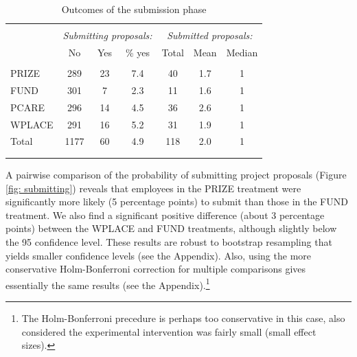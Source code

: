 \documentclass[12pt, titlepage]{article}
\begin{document}
\begin{table}
\centering
\caption{Outcomes of the submission phase}
\label{tab: submissions}
\begin{tabular}{@{}lcccccc}
  \\[-1.8ex]\hline \hline \\[-1.8ex]
 & \multicolumn{3}{c}{\emph{Submitting proposals:}}& \multicolumn{3}{c}{\emph{Submitted proposals:}} \\
 \cmidrule(lr){2-4}\cmidrule(lr){5-7} & No & Yes & \% yes & Total & Mean & Median \\ 
  \hline \\[-1.86ex]
PRIZE & 289 & 23 & 7.4 & 40 & 1.7 & 1 \\ 
  FUND & 301 & 7 & 2.3 & 11 & 1.6 & 1 \\ 
  PCARE & 296 & 14 & 4.5 & 36 & 2.6 & 1 \\ 
  WPLACE & 291 & 16 & 5.2 & 31 & 1.9 & 1 \\ 
  [1.8ex] Total & 1177 & 60 & 4.9 & 118 & 2.0 & 1 \\ 
   \\[-1.8ex]\hline \hline \\[-1.8ex]
\end{tabular}
\end{table}

A pairwise comparison of the probability of submitting project proposals
(Figure \ref{fig: submitting}) reveals that employees in the PRIZE
treatment were significantly more likely (5 percentage points) to submit
than those in the FUND treatment. We also find a significant positive
difference (about 3 percentage points) between the WPLACE and FUND
treatments, although slightly below the 95 confidence level. These
results are robust to bootstrap resampling that yields smaller
confidence levels (see the Appendix). Also, using the more conservative
Holm-Bonferroni correction for multiple comparisons gives essentially
the same results (see the Appendix).\footnote{The Holm-Bonferroni
  precedure is perhaps too conservative in this case, also considered
  the experimental intervention was fairly small (small effect sizes).}
\end{document}
